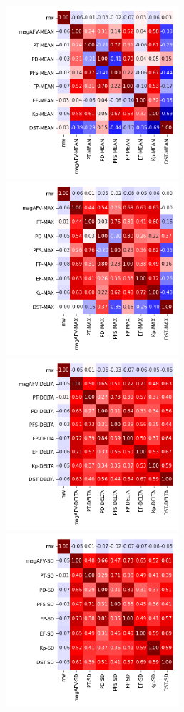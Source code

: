 \documentclass[12pt]{article}
\begin{document}
\newpage

\begin{figure}
   \includegraphics[width=0.57\textwidth]{seven-eight_mean_1.png}
   \includegraphics[width=0.57\textwidth]{seven-eight_max_1.png}
   \includegraphics[width=0.57\textwidth]{seven-eight_delta_1.png}
   \includegraphics[width=0.57\textwidth]{seven-eight_sd_1.png}
\end{figure}
\end{document}

